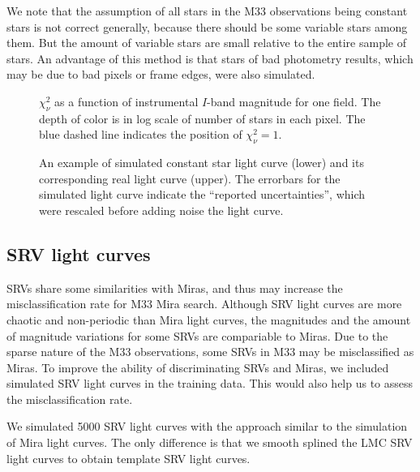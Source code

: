 We note that the assumption of all stars in the M33 observations being constant stars is not correct generally, because there should be some variable stars among them. But the amount of variable stars are small relative to the entire sample of stars. An advantage of this method is that stars of bad photometry results, which may be due to bad pixels or frame edges, were also simulated.


\begin{figure}
\caption{$\chi_\nu^2$ as a function of instrumental $I$-band magnitude for one field. The depth of color is in log scale of number of stars in each pixel. The blue dashed line indicates the position of $\chi_\nu^2=1$.}\label{fig.chi.dist.example}
\end{figure}

\begin{figure}
\caption{An example of simulated constant star light curve (lower) and its corresponding real light curve (upper). The errorbars for the simulated light curve indicate the ``reported uncertainties'', which were rescaled before adding noise the light curve.}\label{fig.const.flc.example}
\end{figure}

\subsection{SRV light curves}

SRVs share some similarities with Miras, and thus may increase the misclassification rate for M33 Mira search. Although SRV light curves are more chaotic and non-periodic than Mira light curves, the magnitudes and the amount of magnitude variations for some SRVs are compariable to Miras. Due to the sparse nature of the M33 observations, some SRVs in M33 may be misclassified as Miras. To improve the ability of discriminating SRVs and Miras, we included simulated SRV light curves in the training data. This would also help us to assess the misclassification rate.

We simulated 5000 SRV light curves with the approach similar to the simulation of Mira light curves. The only difference is that we smooth splined the LMC SRV light curves to obtain template SRV light curves.
